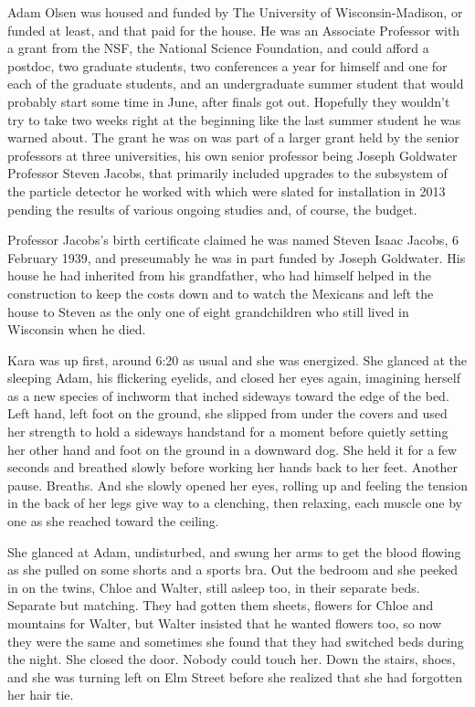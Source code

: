 Adam Olsen was housed and funded by The University of Wisconsin-Madison, or funded at least, and that paid for the house. He was an Associate Professor with a grant from the NSF, the National Science Foundation, and could afford a postdoc, two graduate students, two conferences a year for himself and one for each of the graduate students, and an undergraduate summer student that would probably start some time in June, after finals got out. Hopefully they wouldn't try to take two weeks right at the beginning like the last summer student he was warned about. The grant he was on was part of a larger grant held by the senior professors at three universities, his own senior professor being Joseph Goldwater Professor Steven Jacobs, that primarily included upgrades to the subsystem of the particle detector he worked with which were slated for installation in 2013 pending the results of various ongoing studies and, of course, the budget. 

Professor Jacobs's birth certificate claimed he was named Steven Isaac Jacobs, 6 February 1939, and preseumably he was in part funded by Joseph Goldwater. His house he had inherited from his grandfather, who had himself helped in the construction to keep the costs down and to watch the Mexicans and left the house to Steven as the only one of eight grandchildren who still lived in Wisconsin when he died.

\mymark

Kara was up first, around 6:20 as usual and she was energized. She glanced at the sleeping Adam, his flickering eyelids, and closed her eyes again, imagining herself as a new species of inchworm that inched sideways toward the edge of the bed. Left hand, left foot on the ground, she slipped from under the covers and used her strength to hold a sideways handstand for a moment before quietly setting her other hand and foot on the ground in a downward dog. She held it for a few seconds and breathed slowly before working her hands back to her feet. Another pause. Breaths. And she slowly opened her eyes, rolling up and feeling the tension in the back of her legs give way to a clenching, then relaxing, each muscle one by one as she reached toward the ceiling.

She glanced at Adam, undisturbed, and swung her arms to get the blood flowing as she pulled on some shorts and a sports bra. Out the bedroom and she peeked in on the twins, Chloe and Walter, still asleep too, in their separate beds. Separate but matching. They had gotten them sheets, flowers for Chloe and mountains for Walter, but Walter insisted that he wanted flowers too, so now they were the same and sometimes she found that they had switched beds during the night. She closed the door. Nobody could touch her. Down the stairs, shoes, and she was turning left on Elm Street before she realized that she had forgotten her hair tie.


